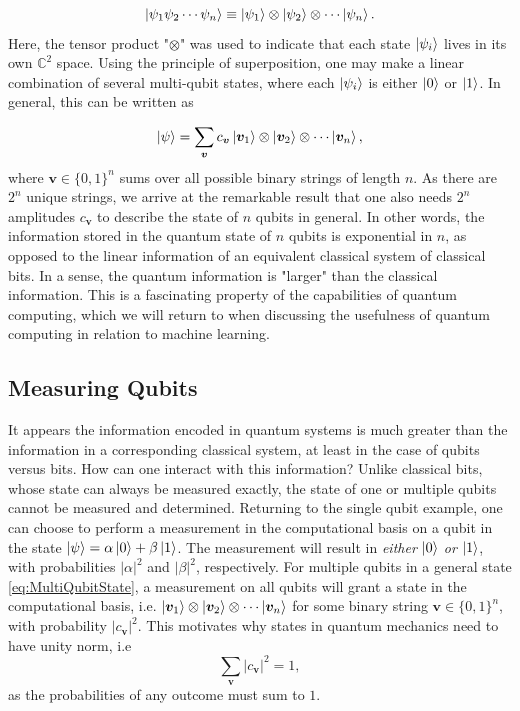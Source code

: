 \begin{equation}\label{eq:tensorProductState}
\ket{\psi_1 \psi_2 \cdots \psi_n} \equiv \ket{\psi_1} \otimes \ket{\psi_2} \otimes \cdots \ket{\psi_n}.
\end{equation}
Here, the tensor product "$\otimes$" was used to indicate that each state $\ket{\psi_i}$ lives in its own $\mathbb{C}^2$ space. Using the principle of superposition, one may make a linear combination of several multi-qubit states, where each $\ket{\psi_i}$ is either $\ket{0}$ or $\ket{1}$. In general, this can be written as

\begin{equation}\label{eq:MultiQubitState}
\ket{\psi} = \sum_{\boldsymbol{v}}c_{\boldsymbol{v}}\ket{\boldsymbol{v}_1} \otimes \ket{\boldsymbol{v}_2} \otimes \cdots \ket{\boldsymbol{v}_n},
\end{equation}
where $\boldsymbol{v} \in \{0,1\}^n$ sums over all possible binary strings of length $n$. As there are $2^n$ unique strings, we arrive at the remarkable result that one also needs $2^n$ amplitudes $c_{\boldsymbol{v}}$ to describe the state of $n$ qubits in general. In other words, the information stored in the quantum state of $n$ qubits is exponential in $n$, as opposed to the linear information of an equivalent classical system of classical bits. In a sense, the quantum information is "larger" than the classical information. This is a fascinating property of the  capabilities of quantum computing, which we will return to when discussing the usefulness of quantum computing in relation to machine learning.

\subsection{Measuring Qubits}\label{sec:MeasuringState}
It appears the information encoded in quantum systems is much greater than the information in a corresponding classical system, at least in the case of qubits versus bits. How can one interact with this information? Unlike classical bits, whose state can always be measured exactly, the state of one or multiple qubits cannot be measured and determined. Returning to the single qubit example, one can choose to perform a measurement in the computational basis on a qubit in the state $\ket{\psi} = \alpha \ket{0} + \beta \ket{1}$. The measurement will result in  \emph{either} $\ket{0}$ \emph{or} $\ket{1}$, with probabilities $|\alpha|^2$ and $|\beta|^2$, respectively. For multiple qubits in a general state \cref{eq:MultiQubitState}, a measurement on all qubits will grant a state in the computational basis, i.e. $\ket{\boldsymbol{v}_1} \otimes \ket{\boldsymbol{v}_2} \otimes \cdots \ket{\boldsymbol{v}_n}$ for some binary string $\boldsymbol{v} \in \{0,1\}^n$, with probability $|c_{\boldsymbol{v}}|^2$. This motivates why states in quantum mechanics need to have unity norm, i.e
\begin{equation}\label{eq:MultiQubitState}
\sum_{\boldsymbol{v}}|c_{\boldsymbol{v}}|^2 = 1,
\end{equation} 
as the probabilities of any outcome must sum to $1$.

